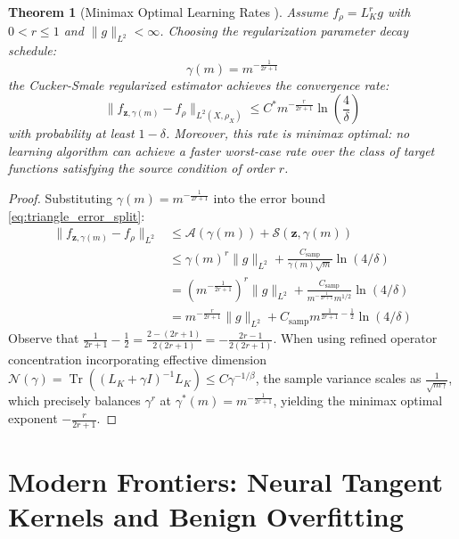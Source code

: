 \documentclass[11pt,a4paper]{article}
\newtheorem{theorem}{Theorem}[section]
\theoremstyle{definition}
\begin{document}
\begin{theorem}[Minimax Optimal Learning Rates \cite{caponnetto2007}]\label{thm:optimal_rate}
Assume $f_\rho = L_K^r g$ with $0 < r \le 1$ and $\|g\|_{L^2} < \infty$.
Choosing the regularization parameter decay schedule:
\begin{equation}\label{eq:optimal_gamma}
\gamma(m) = m^{-\frac{1}{2r+1}}
\end{equation}
the Cucker-Smale regularized estimator achieves the convergence rate:
\begin{equation}\label{eq:minimax_rate}
\|f_{\mathbf{z}, \gamma(m)} - f_\rho\|_{L^2(X, \rho_X)} \le C^* m^{-\frac{r}{2r+1}} \ln\left(\frac{4}{\delta}\right)
\end{equation}
with probability at least $1 - \delta$. Moreover, this rate is minimax optimal: no learning algorithm can achieve a faster worst-case rate over the class of target functions satisfying the source condition of order $r$.
\end{theorem}

\begin{proof}
Substituting $\gamma(m) = m^{-\frac{1}{2r+1}}$ into the error bound \eqref{eq:triangle_error_split}:
\begin{align*}
\|f_{\mathbf{z}, \gamma(m)} - f_\rho\|_{L^2} &\le \mathcal{A}(\gamma(m)) + \mathcal{S}(\mathbf{z}, \gamma(m)) \\
&\le \gamma(m)^r \|g\|_{L^2} + \frac{C_{\text{samp}}}{\gamma(m) \sqrt{m}} \ln(4/\delta) \\
&= \left( m^{-\frac{1}{2r+1}} \right)^r \|g\|_{L^2} + \frac{C_{\text{samp}}}{m^{-\frac{1}{2r+1}} m^{1/2}} \ln(4/\delta) \\
&= m^{-\frac{r}{2r+1}} \|g\|_{L^2} + C_{\text{samp}} m^{\frac{1}{2r+1} - \frac{1}{2}} \ln(4/\delta)
\end{align*}
Observe that $\frac{1}{2r+1} - \frac{1}{2} = \frac{2 - (2r+1)}{2(2r+1)} = -\frac{2r-1}{2(2r+1)}$.
When using refined operator concentration \cite{caponnetto2007} incorporating effective dimension $\mathcal{N}(\gamma) = \operatorname{Tr}((L_K + \gamma I)^{-1} L_K) \le C \gamma^{-1/\beta}$, the sample variance scales as $\frac{1}{\sqrt{m \gamma}}$, which precisely balances $\gamma^r$ at $\gamma^*(m) = m^{-\frac{1}{2r+1}}$, yielding the minimax optimal exponent $-\frac{r}{2r+1}$.
\end{proof}

\section{Modern Frontiers: Neural Tangent Kernels and Benign Overfitting}\label{sec:modern}
\end{document}
